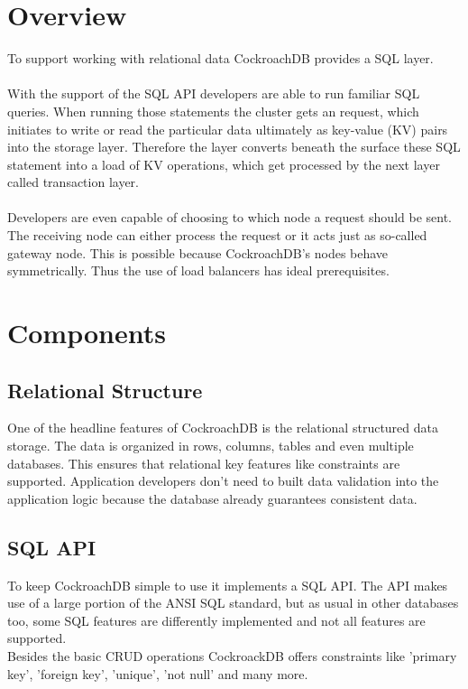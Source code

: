 \documentclass[12pt,a4paper]{article}
\begin{document}
\section{Overview}
To support working with relational data CockroachDB provides a SQL layer.\\ \\
With the support of the SQL API developers are able to run familiar SQL queries. When running those statements the cluster gets an request, which initiates to write or read the particular data ultimately as key-value (KV) pairs into the storage layer.
Therefore the layer converts beneath the surface these SQL statement into a load of KV operations, which get processed by the next layer called transaction layer.\\ \\
Developers are even capable of choosing to which node a request should be sent. The receiving node can either process the request or it acts just as so-called gateway node. This is possible because CockroachDB's nodes behave symmetrically. Thus the use of load balancers has ideal prerequisites.

\section{Components}
\subsection{Relational Structure}
One of the headline features of CockroachDB is the relational structured data storage. The data is organized in rows, columns, tables and even multiple databases. This ensures that relational key features like constraints are supported. Application developers don't need to built data validation into the application logic because the database already guarantees consistent data.

\subsection{SQL API}
To keep CockroachDB simple to use it implements a SQL API. The API makes use of a large portion of the ANSI SQL standard, but
as usual in other databases too, some SQL features are differently implemented and not all features are supported. \\
Besides the basic CRUD operations CockroackDB offers constraints like 'primary key', 'foreign key', 'unique', 'not null' and
many more.\\
\end{document}
